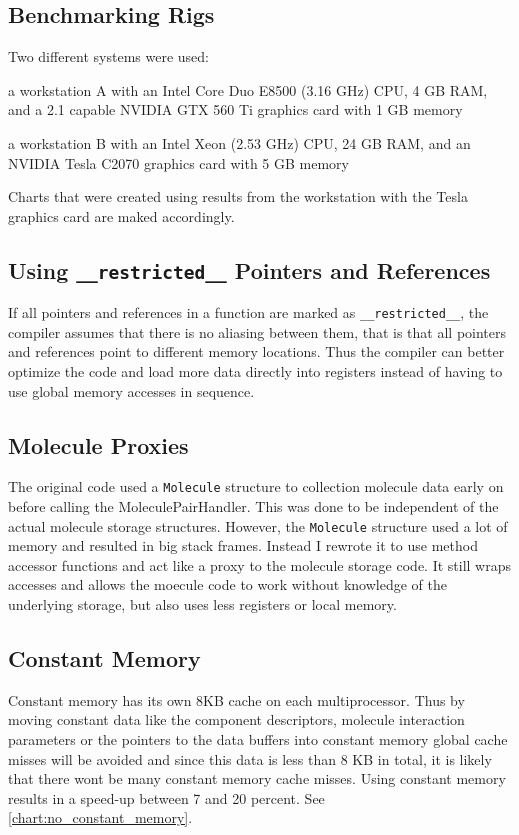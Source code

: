 \label{sec:opst_and_results}

\subsection{Benchmarking Rigs}
Two different systems were used:
\begin{compactitem}
\item a workstation A with an Intel Core Duo E8500 (\@ 3.16 GHz) CPU, 4 GB RAM, and a \cuda{} 2.1 capable NVIDIA GTX 560 Ti graphics card with 1 GB memory
\item a workstation B with an Intel Xeon (\@ 2.53 GHz) CPU, 24 GB RAM, and an NVIDIA Tesla C2070 graphics card with 5 GB memory
\end{compactitem}
Charts that were created using results from the workstation with the Tesla graphics card are maked accordingly.

\subsection{Using \lstinline!__restricted__! Pointers and References}
If all pointers and references in a function are marked as \lstinline!__restricted__!, the compiler assumes that there is no aliasing between them, that is that all pointers and references point to different memory locations.
Thus the compiler can better optimize the code and load more data directly into registers instead of having to use global memory accesses in sequence.

\subsection{Molecule Proxies}
The original code used a \lstinline!Molecule! structure to collection molecule data early on before calling the MoleculePairHandler. This was done to be independent of the actual molecule storage structures.
However, the \lstinline!Molecule! structure used a lot of memory and resulted in big stack frames.
Instead I rewrote it to use method accessor functions and act like a proxy to the molecule storage code. It still wraps accesses and allows the moecule code to work without knowledge of the underlying storage, but also uses less registers or local memory.

\subsection{Constant Memory}
Constant memory has its own 8KB cache on each multiprocessor. Thus by moving constant data like the component descriptors, molecule interaction parameters or the pointers to the data buffers into constant memory global cache misses will be avoided and since this data is less than 8 KB in total, it is likely that there wont be many constant memory cache misses.
Using constant memory results in a speed-up between 7 and 20 percent. See \autoref{chart:no_constant_memory}.

